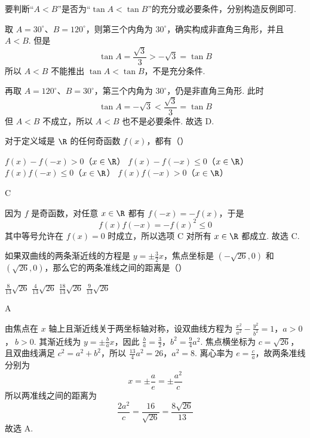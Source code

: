 \begin{solution}
要判断“\(A<B\)”是否为“\(\tan A<\tan B\)”的充分或必要条件，分别构造反例即可.

取 \(A=30^\circ\)、\(B=120^\circ\)，则第三个内角为 \(30^\circ\)，确实构成非直角三角形，并且 \(A<B\). 但是
\[
\tan A=\frac{\sqrt3}{3}>-\sqrt3=\tan B
\]
所以 \(A<B\) 不能推出 \(\tan A<\tan B\)，不是充分条件.

再取 \(A=120^\circ\)、\(B=30^\circ\)，第三个内角为 \(30^\circ\)，仍是非直角三角形. 此时
\[
\tan A=-\sqrt3<\frac{\sqrt3}{3}=\tan B
\]
但 \(A<B\) 不成立，所以 \(A<B\) 也不是必要条件. 故选 D.
\end{solution}

\begin{problem}
对于定义域是 \(\R\) 的任何奇函数 \(f(x)\)，都有（\quad）

\choices
    {\(f(x)-f(-x)>0\)（\(x\in\R\)）}
    {\(f(x)-f(-x)\leqslant 0\)（\(x\in\R\)）}
    {\(f(x)f(-x)\leqslant 0\)（\(x\in\R\)）}
    {\(f(x)f(-x)>0\)（\(x\in\R\)）}
\end{problem}

\begin{answer}
C
\end{answer}

\begin{solution}
因为 \(f\) 是奇函数，对任意 \(x\in\R\) 都有 \(f(-x)=-f(x)\)，于是
\[
f(x)f(-x)=-f(x)^2\leqslant0
\]
其中等号允许在 \(f(x)=0\) 时成立，所以选项 C 对所有 \(x\in\R\) 都成立. 故选 C.
\end{solution}

\begin{problem}
如果双曲线的两条渐近线的方程是 \(y=\pm\frac{3}{2}x\)，焦点坐标是 \((-\sqrt{26},0)\) 和 \((\sqrt{26},0)\)，那么它的两条准线之间的距离是（\quad）

\choices
    {\(\frac{8}{13}\sqrt{26}\)}
    {\(\frac{4}{13}\sqrt{26}\)}
    {\(\frac{18}{13}\sqrt{26}\)}
    {\(\frac{9}{13}\sqrt{26}\)}
\end{problem}

\begin{answer}
A
\end{answer}

\begin{solution}
由焦点在 \(x\) 轴上且渐近线关于两坐标轴对称，设双曲线方程为
\(\frac{x^2}{a^2}-\frac{y^2}{b^2}=1\)，\(a>0\)，\(\ b>0\).
其渐近线为 \(y=\pm\frac ba x\)，因此
\(\frac{b}{a}=\frac32\)，\(b^2=\frac94a^2\).
焦点横坐标为 \(c=\sqrt{26}\)，且双曲线满足 \(c^2=a^2+b^2\)，所以
\(\frac{13}{4}a^2=26\)，\(a^2=8\).
离心率为 \(e=\frac ca\)，故两条准线分别为
\[
x=\pm\frac ae=\pm\frac{a^2}{c}
\]
所以两准线之间的距离为
\[
\frac{2a^2}{c}=\frac{16}{\sqrt{26}}=\frac{8\sqrt{26}}{13}
\]
故选 A.
\end{solution}

